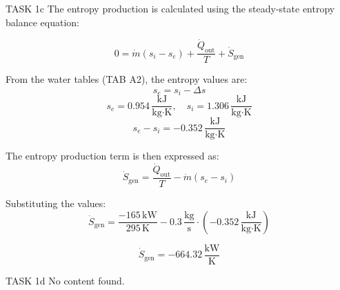 TASK 1c  
The entropy production is calculated using the steady-state entropy balance equation:  

\[
0 = \dot{m}(s_i - s_e) + \frac{\dot{Q}_{\text{out}}}{T} + \dot{S}_{\text{gen}}
\]

From the water tables (TAB A2), the entropy values are:  
\[
s_e = s_i - \Delta s
\]
\[
s_e = 0.954 \, \frac{\text{kJ}}{\text{kg·K}}, \quad s_i = 1.306 \, \frac{\text{kJ}}{\text{kg·K}}
\]
\[
s_e - s_i = -0.352 \, \frac{\text{kJ}}{\text{kg·K}}
\]

The entropy production term is then expressed as:  
\[
\dot{S}_{\text{gen}} = \frac{\dot{Q}_{\text{out}}}{T} - \dot{m}(s_e - s_i)
\]

Substituting the values:  
\[
\dot{S}_{\text{gen}} = \frac{-165 \, \text{kW}}{295 \, \text{K}} - 0.3 \, \frac{\text{kg}}{\text{s}} \cdot (-0.352 \, \frac{\text{kJ}}{\text{kg·K}})
\]

\[
\dot{S}_{\text{gen}} = -664.32 \, \frac{\text{kW}}{\text{K}}
\]

TASK 1d  
No content found.